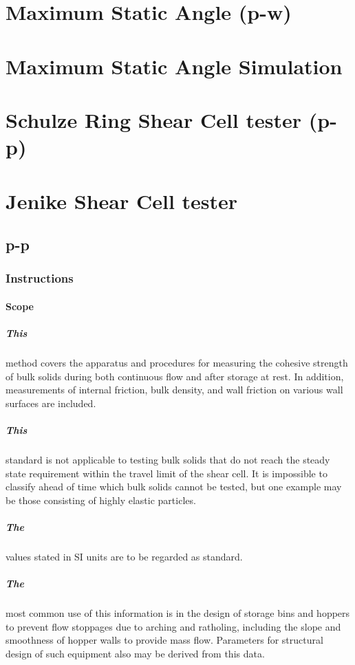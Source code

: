 \lipsum[1]

\section{Maximum Static Angle (p-w)}
\label{sec:msa}

\lipsum[1]

\section{Maximum Static Angle Simulation}
\label{sec:msasimulation}

\lipsum[1]

\section{Schulze Ring Shear Cell tester (p-p)}
\label{sec:SRSCT}

\lipsum[1]

\section{Jenike Shear Cell tester}
\label{sec:jsct}

\lipsum[1]

\subsection{p-p}
\label{subsec:JSCTpp}

\lipsum[2]

\subsubsection{Instructions}
\label{subsubsec:instructions}

\paragraph{Scope}
\label{paragraph:scope}
\subparagraph{This} method covers the apparatus and procedures for measuring the cohesive strength of bulk solids during both continuous flow and after storage at rest. In addition, measurements of internal friction, bulk density, and wall friction on various wall surfaces are included.
\subparagraph{This} standard is not applicable to testing bulk solids that do not reach the steady state requirement within the travel limit of the shear cell. It is impossible to classify ahead of time which bulk solids cannot be tested, but one example may be those consisting of highly elastic particles.
\subparagraph{The} values stated in SI units are to be regarded as standard.
\subparagraph{The} most common use of this information is in the design of storage bins and hoppers to prevent flow stoppages due to arching and ratholing, including the slope and smoothness of hopper walls to provide mass flow. Parameters for structural design of such equipment also may be derived from this data.
